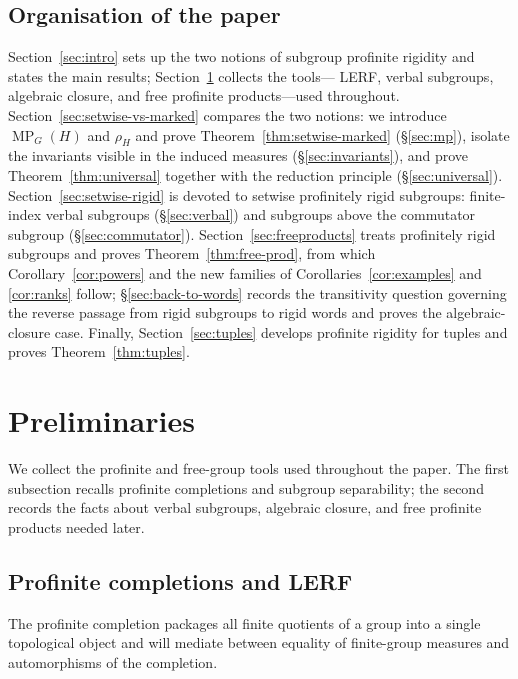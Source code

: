 \documentclass[11pt]{amsart}
\theoremstyle{plain}
\theoremstyle{definition}
\newcommand{\MP}{\operatorname{MP}}
\begin{document}
\subsection*{Organisation of the paper}

Section~\ref{sec:intro} sets up the two notions of subgroup profinite rigidity
and states the main results; Section~\ref{sec:prelim} collects the tools---
LERF, verbal subgroups, algebraic closure, and free profinite products---used
throughout. Section~\ref{sec:setwise-vs-marked} compares the two notions: we
introduce $\MP_G(H)$ and $\rho_H$ and prove Theorem~\ref{thm:setwise-marked}
(\S\ref{sec:mp}), isolate the invariants visible in the induced measures
(\S\ref{sec:invariants}), and prove Theorem~\ref{thm:universal} together with
the reduction principle (\S\ref{sec:universal}). Section~\ref{sec:setwise-rigid}
is devoted to setwise profinitely rigid subgroups: finite-index verbal
subgroups (\S\ref{sec:verbal}) and subgroups above the commutator subgroup
(\S\ref{sec:commutator}). Section~\ref{sec:freeproducts} treats profinitely
rigid subgroups and proves Theorem~\ref{thm:free-prod}, from which
Corollary~\ref{cor:powers} and the new families of
Corollaries~\ref{cor:examples} and \ref{cor:ranks} follow;
\S\ref{sec:back-to-words} records the transitivity question governing the
reverse passage from rigid subgroups to rigid words and proves the algebraic-closure case. Finally, Section~\ref{sec:tuples} develops profinite rigidity for
tuples and proves Theorem~\ref{thm:tuples}.

\section{Preliminaries}\label{sec:prelim}

We collect the profinite and free-group tools used throughout the paper. The
first subsection recalls profinite completions and subgroup separability; the
second records the facts about verbal subgroups, algebraic closure, and free
profinite products needed later.

\subsection{Profinite completions and LERF}\label{sec:lerf}

The profinite completion packages all finite quotients of a group into a single
topological object and will mediate between equality of finite-group measures
and automorphisms of the completion.
\end{document}
